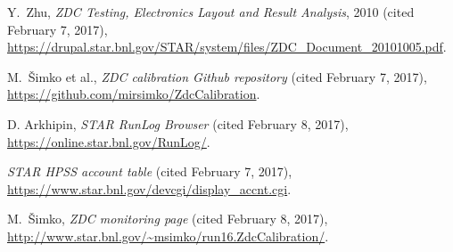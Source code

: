 \begin{thebibliography}{9}
 Y.\ Zhu, \textit{ZDC Testing, Electronics Layout and Result Analysis}, 2010
(cited February 7, 2017),
\url{https://drupal.star.bnl.gov/STAR/system/files/ZDC_Document_20101005.pdf}.

 M.\ Šimko et al., \textit{ZDC calibration Github repository}
(cited February 7, 2017), \url{https://github.com/mirsimko/ZdcCalibration}.

 D. Arkhipin, \textit{STAR RunLog Browser} (cited February 8, 2017),
\url{https://online.star.bnl.gov/RunLog/}.

 \textit{STAR HPSS account table} (cited February 7, 2017),
\url{https://www.star.bnl.gov/devcgi/display_accnt.cgi}.

 M.\ Šimko, \textit{ZDC monitoring page} (cited February 8, 2017),
\url{http://www.star.bnl.gov/~msimko/run16.ZdcCalibration/}.
\end{thebibliography}
